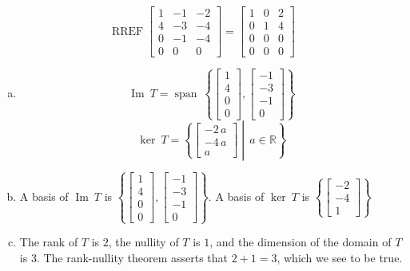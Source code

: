 \begin{exerciseAnswer} 


\[\operatorname{RREF} \left[\begin{array}{ccc}
1 & -1 & -2 \\
4 & -3 & -4 \\
0 & -1 & -4 \\
0 & 0 & 0
\end{array}\right] = \left[\begin{array}{ccc}
1 & 0 & 2 \\
0 & 1 & 4 \\
0 & 0 & 0 \\
0 & 0 & 0
\end{array}\right] \]


\begin{enumerate}[(a)]
\item \[\operatorname{Im}\ T = \operatorname{span}\  \left\{ \left[\begin{array}{c}
1 \\
4 \\
0 \\
0
\end{array}\right] , \left[\begin{array}{c}
-1 \\
-3 \\
-1 \\
0
\end{array}\right] \right\} \]\[\operatorname{ker}\ T =  \left\{ \left[\begin{array}{c}
-2 \, a \\
-4 \, a \\
a
\end{array}\right] \middle|\,a\in\mathbb{R}\right\} \]
\item  A basis of \(\operatorname{Im}\ T\) is \( \left\{ \left[\begin{array}{c}
1 \\
4 \\
0 \\
0
\end{array}\right] , \left[\begin{array}{c}
-1 \\
-3 \\
-1 \\
0
\end{array}\right] \right\} \). A basis of \(\operatorname{ker}\ T\) is \( \left\{ \left[\begin{array}{c}
-2 \\
-4 \\
1
\end{array}\right] \right\} \)
\item  The rank of \(T\) is \( 2 \), the nullity of \(T\) is \( 1 \), and the dimension of the domain of \(T\) is \( 3 \). The rank-nullity theorem asserts that \( 2 + 1 = 3 \), which we see to be true. 
\end{enumerate}
    
\end{exerciseAnswer}
    
